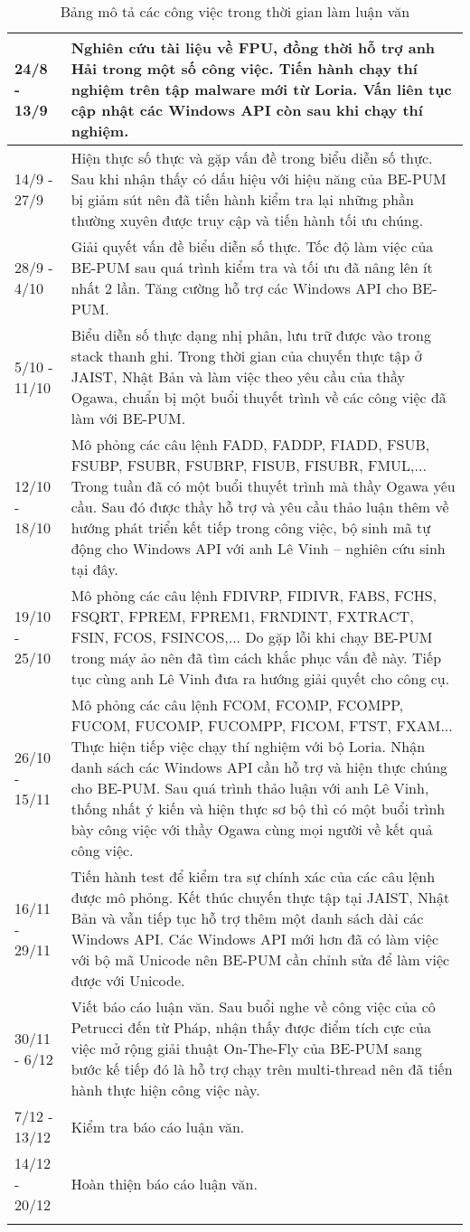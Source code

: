 \begin{longtable}{|l|m{11cm}|}
			24/8 - 13/9&	Nghiên cứu tài liệu về FPU, đồng thời hỗ trợ anh Hải trong một số công việc. Tiến hành chạy thí nghiệm trên tập malware mới từ Loria. Vấn liên tục cập nhật các Windows API còn sau khi chạy thí nghiệm.\\
		\hline	
			14/9 - 27/9	& Hiện thực số thực và gặp vấn đề trong biểu diễn số thực. Sau khi nhận thấy có dấu hiệu với hiệu năng của BE-PUM bị giảm sút nên đã tiến hành kiểm tra lại những phần thường xuyên được truy cập và tiến hành tối ưu chúng.\\
		\hline	
			28/9 - 4/10&	Giải quyết vấn đề biểu diễn số thực. Tốc độ làm việc của BE-PUM sau quá trình kiểm tra và tối ưu đã nâng lên ít nhất 2 lần. Tăng cường hỗ trợ các Windows API cho BE-PUM.\\
		\hline	
			5/10 - 11/10&	Biểu diễn số thực dạng nhị phân, lưu trữ được vào trong stack thanh ghi. Trong thời gian của chuyến thực tập ở JAIST, Nhật Bản và làm việc theo yêu cầu của thầy Ogawa, chuẩn bị một buổi thuyết trình về các công việc đã làm với BE-PUM.\\
		\hline	
			12/10 - 18/10&	Mô phỏng các câu lệnh FADD, FADDP, FIADD, FSUB, FSUBP, FSUBR, FSUBRP, FISUB, FISUBR, FMUL,... Trong tuần đã có một buổi thuyết trình mà thầy Ogawa yêu cầu. Sau đó được thầy hỗ trợ và yêu cầu thảo luận thêm về hướng phát triển kết tiếp trong công việc, bộ sinh mã tự động cho Windows API với anh Lê Vinh -- nghiên cứu sinh tại đây.\\
		\hline	
			19/10 - 25/10&	Mô phỏng các câu lệnh  FDIVRP, FIDIVR, FABS, FCHS, FSQRT, FPREM, FPREM1, FRNDINT, FXTRACT, FSIN, FCOS, FSINCOS,... Do gặp lỗi khi chạy BE-PUM trong máy ảo nên đã tìm cách khắc phục vấn đề này. Tiếp tục cùng anh Lê Vinh đưa ra hướng giải quyết cho công cụ.\\
		\hline
			26/10 - 15/11	& Mô phỏng các câu lệnh FCOM, FCOMP, FCOMPP, FUCOM, FUCOMP, FUCOMPP, FICOM,  FTST, FXAM... Thực hiện tiếp việc chạy thí nghiệm với bộ Loria. Nhận danh sách các Windows API cần hỗ trợ và hiện thực chúng cho BE-PUM. Sau quá trình thảo luận với anh Lê Vinh, thống nhất ý kiến và hiện thực sơ bộ thì có một buổi trình bày công việc với thầy Ogawa cùng mọi người về kết quả công việc.\\		
		\hline	
			16/11 - 29/11&	Tiến hành test để kiểm tra sự chính xác của các câu lệnh được mô phỏng. Kết thúc chuyến thực tập tại JAIST, Nhật Bản và vẫn tiếp tục hỗ trợ thêm một danh sách dài các Windows API. Các Windows API mới hơn đã có làm việc với bộ mã Unicode nên BE-PUM cần chỉnh sửa để làm việc được với Unicode.\\
		\hline	
			30/11 - 6/12	& Viết báo cáo luận văn. Sau buổi nghe về công việc của cô Petrucci đến từ Pháp, nhận thấy được điểm tích cực của việc mở rộng giải thuật On-The-Fly của BE-PUM sang bước kế tiếp đó là hỗ trợ chạy trên multi-thread nên đã tiến hành thực hiện công việc này.\\
		\hline	
			7/12 - 13/12	& Kiểm tra báo cáo luận văn.\\
		\hline	
			14/12 - 20/12&	Hoàn thiện báo cáo luận văn.\\
		\hline
			\caption{Bảng mô tả các công việc trong thời gian làm luận văn}			
			\label{table:tblSchedule}
	\end{longtable}